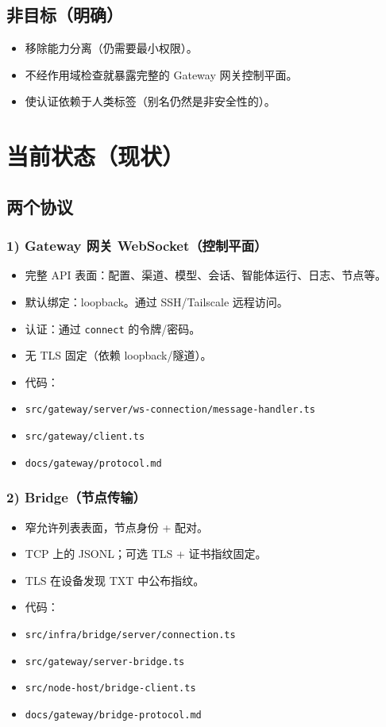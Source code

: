 \subsection{非目标（明确）}


\begin{itemize}
  \item 移除能力分离（仍需要最小权限）。
  \item 不经作用域检查就暴露完整的 Gateway 网关控制平面。
  \item 使认证依赖于人类标签（别名仍然是非安全性的）。
\end{itemize}


\hrulefill


\section{当前状态（现状）}


\subsection{两个协议}


\subsubsection{1) Gateway 网关 WebSocket（控制平面）}


\begin{itemize}
  \item 完整 API 表面：配置、渠道、模型、会话、智能体运行、日志、节点等。
  \item 默认绑定：loopback。通过 SSH/Tailscale 远程访问。
  \item 认证：通过 \texttt{connect} 的令牌/密码。
  \item 无 TLS 固定（依赖 loopback/隧道）。
  \item 代码：
  \item \texttt{src/gateway/server/ws-connection/message-handler.ts}
  \item \texttt{src/gateway/client.ts}
  \item \texttt{docs/gateway/protocol.md}
\end{itemize}


\subsubsection{2) Bridge（节点传输）}


\begin{itemize}
  \item 窄允许列表表面，节点身份 + 配对。
  \item TCP 上的 JSONL；可选 TLS + 证书指纹固定。
  \item TLS 在设备发现 TXT 中公布指纹。
  \item 代码：
  \item \texttt{src/infra/bridge/server/connection.ts}
  \item \texttt{src/gateway/server-bridge.ts}
  \item \texttt{src/node-host/bridge-client.ts}
  \item \texttt{docs/gateway/bridge-protocol.md}
\end{itemize}


